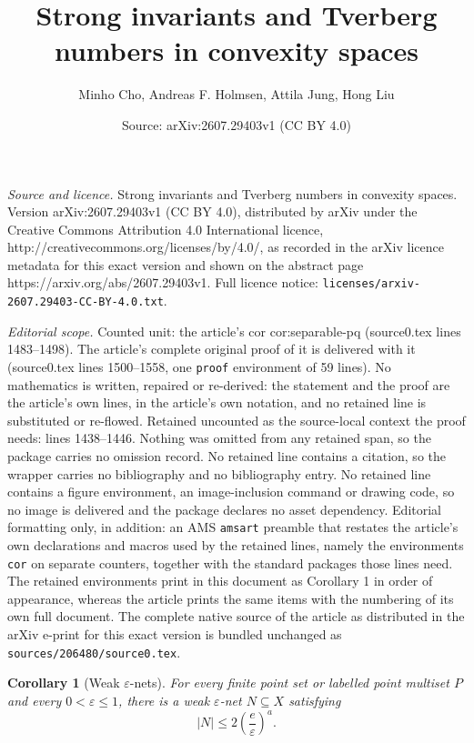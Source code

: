 \documentclass[10pt,a4paper]{amsart}
\title{Strong invariants and Tverberg numbers in convexity spaces}
\author{Minho Cho, Andreas F. Holmsen, Attila Jung, Hong Liu}
\date{Source: arXiv:2607.29403v1 (CC BY 4.0)}
\newtheorem{cor}{Corollary}
\begin{document}
\maketitle

\noindent\emph{Source and licence.} Strong invariants and Tverberg numbers in convexity spaces. Version arXiv:2607.29403v1 (CC BY 4.0), distributed by arXiv under the Creative Commons Attribution 4.0 International licence, http://creativecommons.org/licenses/by/4.0/, as recorded in the arXiv licence metadata for this exact version and shown on the abstract page https://arxiv.org/abs/2607.29403v1. Full licence notice: \texttt{licenses/arxiv-2607.29403-CC-BY-4.0.txt}.\par\smallskip

\noindent\textit{Editorial scope.} Counted unit: the article's cor cor:separable-pq (source0.tex lines 1483--1498). The article's complete original proof of it is delivered with it (source0.tex lines 1500--1558, one \texttt{proof} environment of 59 lines). No mathematics is written, repaired or re-derived: the statement and the proof are the article's own lines, in the article's own notation, and no retained line is substituted or re-flowed.  Retained uncounted as the source-local context the proof needs: lines 1438--1446.  Nothing was omitted from any retained span, so the package carries no omission record.  No retained line contains a citation, so the wrapper carries no bibliography and no bibliography entry.  No retained line contains a figure environment, an image-inclusion command or drawing code, so no image is delivered and the package declares no asset dependency.  Editorial formatting only, in addition: an AMS \texttt{amsart} preamble that restates the article's own declarations and macros used by the retained lines, namely the environments \texttt{cor} on separate counters, together with the standard packages those lines need.  The retained environments print in this document as Corollary 1 in order of appearance, whereas the article prints the same items with the numbering of its own full document.  The complete native source of the article as distributed in the arXiv e-print for this exact version is bundled unchanged as \texttt{sources/206480/source0.tex}.
\begin{cor}[Weak $\varepsilon$-nets]
\label{cor:separable-weak-epsilon-net}
For every finite point set or labelled point multiset $P$ and every
$0<\varepsilon\le1$, there is a weak $\varepsilon$-net
$N\subseteq X$ satisfying
\[
|N|\le 2\left(\frac e\varepsilon\right)^a.
\]
\end{cor}
\end{document}
